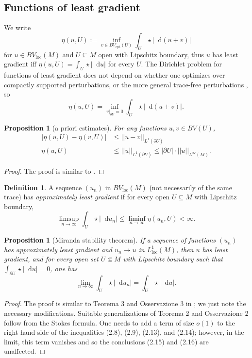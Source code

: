 \documentclass[reqno,11pt]{amsart}
\newcommand*\dif{\mathop{}\!\mathrm{d}}
\newcommand{\dfn}[1]{\emph{#1}\index{#1}}
\newcommand{\loc}{\mathrm{loc}}
\newcommand{\cpt}{\mathrm{cpt}}
\newtheorem{proposition}[theorem]{Proposition}
\theoremstyle{definition}
\newtheorem{definition}[theorem]{Definition}
\numberwithin{equation}{section}
\begin{document}
\subsection{Functions of least gradient}
We write
$$\eta(u, U) := \inf_{v \in BV_\cpt(U)} \int_U \star |\dif(u + v)|$$
for $u \in BV_\loc(M)$ and $U \subseteq M$ open with Lipschitz boundary, thus $u$ has least gradient iff $\eta(u, U) = \int_U \star |\dif u|$ for every $U$.
The Dirichlet problem for functions of least gradient does not depend on whether one optimizes over compactly supported perturbations, or the more general trace-free perturbations \cite{Sternberg93}, so
$$\eta(u, U) = \inf_{v|_{\partial U} = 0} \int_U \star |\dif(u + v)|.$$

\begin{proposition}[a priori estimates]
For any functions $u, v \in BV(U)$,
\begin{align}
|\eta(u, U) - \eta(v, U)| &\leq ||u - v||_{L^1(\partial U)} \label{a priori estimate 1} \\
\eta(u, U) &\leq ||u||_{L^1(\partial U)} \leq |\partial U| \cdot ||u||_{L^\infty(M)}. \label{a priori estimate 2}
\end{align}
\end{proposition}
\begin{proof}
The proof is similar to \cite[Lemma 5.6]{Giusti77}.
\end{proof}

\begin{definition}
A sequence $(u_n)$ in $BV_\loc(M)$ (not necessarily of the same trace) has \dfn{approximately least gradient} if for every open $U \subseteq M$ with Lipschitz boundary,
$$\limsup_{n \to \infty} \int_U \star |\dif u_n| \leq \liminf_{n \to \infty} \eta(u_n, U) < \infty.$$
\end{definition}

\begin{proposition}[Miranda stability theorem]\label{Miranda convergence}
If a sequence of functions $(u_n)$ has approximately least gradient and $u_n \to u$ in $L^1_\loc(M)$, then $u$ has least gradient, and for every open set $U \Subset M$ with Lipschitz boundary such that $\int_{\partial U} \star |\dif u| = 0$, one has
\begin{equation}\label{convergence in total variation}
\lim_{n \to \infty} \int_U \star |\dif u_n| = \int_U \star |\dif u|.
\end{equation}
\end{proposition}
\begin{proof}
The proof is similar to Teorema 3 and Osservazione 3 in \cite{Miranda67}; we just note the necessary modifications.
Suitable generalizations of Teorema 2 and Osservazione 2 follow from the Stokes formula.
One needs to add a term of size $o(1)$ to the right-hand side of the inequalities (2.8), (2.9), (2.13), and (2.14); however, in the limit, this term vanishes and so the conclusions (2.15) and (2.16) are unaffected.
\end{proof}
\end{document}
